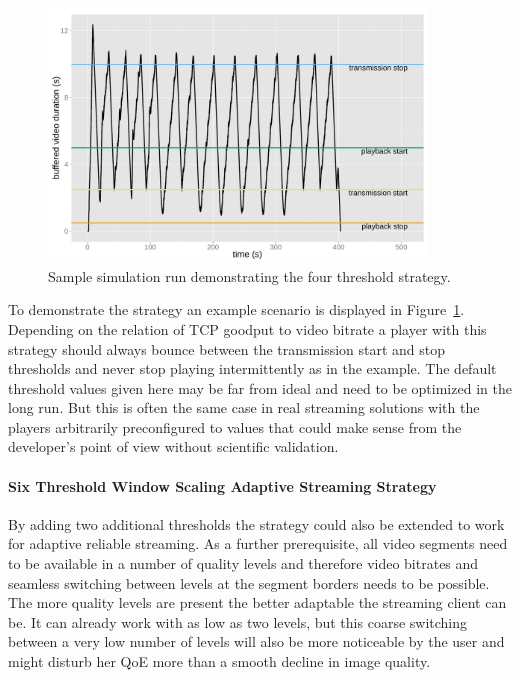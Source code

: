 \begin{figure}[htb]
	\centering
	\includegraphics[width=0.9\textwidth]{images/R-ltesim-plotbuffer-time.pdf}
	\caption{Sample simulation run demonstrating the four threshold strategy.}
\label{c6:fig:ltesim-plotbuffer-time}
\end{figure}

To demonstrate the strategy an example scenario is displayed in Figure~\ref{c6:fig:ltesim-plotbuffer-time}. Depending on the relation of \gls{TCP} goodput to video bitrate a player with this strategy should always bounce between the transmission start and stop thresholds and never stop playing intermittently as in the example. The default threshold values given here may be far from ideal and need to be optimized in the long run. But this is often the same case in real streaming solutions with the players arbitrarily preconfigured to values that could make sense from the developer's point of view without scientific validation.


\paragraph{Six Threshold Window Scaling Adaptive Streaming Strategy}

By adding two additional thresholds the strategy could also be extended to work for adaptive reliable streaming. As a further prerequisite, all video segments need to be available in a number of quality levels and therefore video bitrates and seamless switching between levels at the segment borders needs to be possible. The more quality levels are present the better adaptable the streaming client can be. It can already work with as low as two levels, but this coarse switching between a very low number of levels will also be more noticeable by the user and might disturb her \gls{QoE} more than a smooth decline in image quality.

